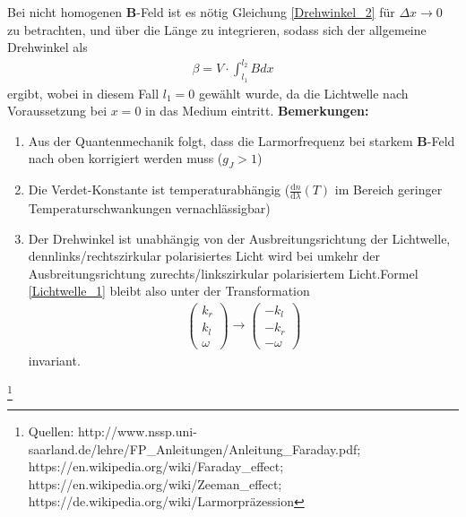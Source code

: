 \documentclass[12pt,a4paper]{article}
\begin{document}
Bei nicht homogenen \textbf{B}-Feld ist es nötig Gleichung \ref{Drehwinkel_2} für $\Delta x \rightarrow 0$ zu betrachten, und über die Länge zu integrieren, sodass sich der allgemeine Drehwinkel als
\begin{align}
\beta = V \cdot \int_{l_1}^{l_2} B dx
\end{align}
ergibt, wobei in diesem Fall $l_1 = 0$ gewählt wurde, da die Lichtwelle nach Voraussetzung bei $x=0$ in das Medium eintritt.\newpage
\textbf{Bemerkungen:}
\begin{enumerate}
\item
Aus der Quantenmechanik folgt, dass die Larmorfrequenz bei starkem \textbf{B}-Feld nach oben korrigiert werden muss ($g_J > 1$)
\item
Die Verdet-Konstante ist temperaturabhängig ($\frac{\text{d} n}{\text{d} \lambda}(T)$ im Bereich geringer Temperaturschwankungen vernachlässigbar)
\item
Der Drehwinkel ist unabhängig von der Ausbreitungsrichtung der Lichtwelle, denn\newline links/rechtszirkular polarisiertes Licht wird bei umkehr der Ausbreitungsrichtung zu\newline rechts/linkszirkular polarisiertem Licht.\newline Formel \ref{Lichtwelle_1} bleibt also unter der Transformation 
\begin{align}
\begin{pmatrix}
k_r \\
k_l \\
\omega
\end{pmatrix} \rightarrow 
\begin{pmatrix}
-k_l\\
-k_r\\
-\omega
\end{pmatrix}
\end{align} invariant. 
\end{enumerate} 

\footnote{Quellen: \newline http://www.nssp.uni-saarland.de/lehre/FP\_Anleitungen/Anleitung\_Faraday.pdf; \newline https://en.wikipedia.org/wiki/Faraday\_effect; https://en.wikipedia.org/wiki/Zeeman\_effect; \newline https://de.wikipedia.org/wiki/Larmorpräzession}
\end{document}
